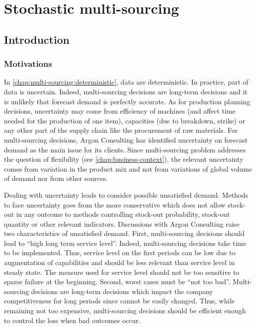 \chapter{Stochastic multi-sourcing}
\label{chap:multi-sourcing:stochastic}


\section{Introduction}
\label{sec:multi-sourcing:stochastic:introduction}


\subsection{Motivations}
\label{sec:multi-sourcing:stochastic:introduction:motivations}


In \cref{chap:multi-sourcing:deterministic}, data are deterministic.
In practice, part of data is uncertain.
Indeed, multi-sourcing decisions are long-term decisions and it is unlikely that forecast demand is perfectly accurate.
As for production planning decisions, uncertainty may come from efficiency of machines (and affect time needed for the production of one item), capacities (due to breakdown, strike) or any other part of the supply chain like the procurement of raw materials.
For multi-sourcing decisions, Argon Consulting has identified uncertainty on forecast demand as the main issue for its clients.
Since multi-sourcing problem addresses the question of flexibility (see \cref{chap:business-context}), the relevant uncertainty comes from variation in the product mix and not from variations of global volume of demand nor from other sources.


Dealing with uncertainty leads to consider possible unsatisfied demand.
Methods to face uncertainty goes from the more conservative which does not allow stock-out in any outcome to methods controlling stock-out probability, stock-out quantity or other relevant indicators.
Discussions with Argon Consulting raise two characteristics of unsatisfied demand.
First, multi-sourcing decisions should lead to ``high long term service level''.
Indeed, multi-sourcing decisions take time to be implemented.
Thus, service level on the first periods can be low due to augmentation of capabilities and should be less relevant than service level in steady state.
The measure used for service level should not be too sensitive to sparse failure at the beginning.
Second, worst cases must be ``not too bad''.
Multi-sourcing decisions are long-term decisions which impact the company competitiveness for long periods since cannot be easily changed.
Thus, while remaining not too expensive, multi-sourcing decisions should be efficient enough to control the loss when bad outcomes occur.


